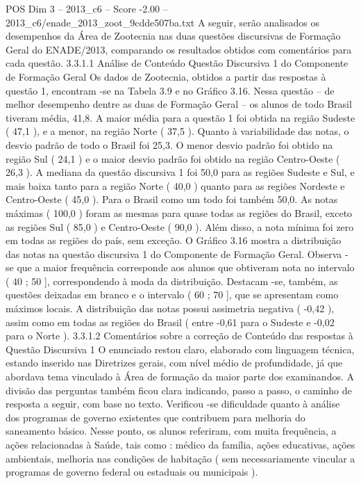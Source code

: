 \begin{textsample}{POS Dim 3 – 2013\_c6 – Score -2.00 – 2013\_c6/enade\_2013\_zoot\_9cdde507ba.txt}
A seguir, serão analisados os desempenhos da Área de Zootecnia nas duas questões discursivas de Formação Geral do ENADE/2013, comparando os resultados obtidos com comentários para cada questão. 3.3.1.1 Análise de Conteúdo Questão Discursiva 1 do Componente de Formação Geral Os dados de Zootecnia, obtidos a partir das respostas à questão 1, encontram -se na Tabela 3.9 e no Gráfico 3.16.
Nessa questão – de melhor desempenho dentre as duas de Formação Geral – os alunos de todo Brasil tiveram média, 41,8.
A maior média para a questão 1 foi obtida na região Sudeste ( 47,1 ), e a menor, na região Norte ( 37,5 ).
Quanto à variabilidade das notas, o desvio padrão de todo o Brasil foi 25,3.
O menor desvio padrão foi obtido na região Sul ( 24,1 ) e o maior desvio padrão foi obtido na região Centro-Oeste ( 26,3 ).
A mediana da questão discursiva 1 foi 50,0 para as regiões Sudeste e Sul, e mais baixa tanto para a região Norte ( 40,0 ) quanto para as regiões Nordeste e Centro-Oeste ( 45,0 ).
Para o Brasil como um todo foi também 50,0.
As notas máximas ( 100,0 ) foram as mesmas para quase todas as regiões do Brasil, exceto as regiões Sul ( 85,0 ) e Centro-Oeste ( 90,0 ).
Além disso, a nota mínima foi zero em todas as regiões do país, sem exceção.
O Gráfico 3.16 mostra a distribuição das notas na questão discursiva 1 do Componente de Formação Geral.
Observa -se que a maior frequência corresponde aos alunos que obtiveram nota no intervalo ( 40 ; 50 ], correspondendo à moda da distribuição.
Destacam -se, também, as questões deixadas em branco e o intervalo ( 60 ; 70 ], que se apresentam como máximos locais.
A distribuição das notas possui assimetria negativa ( -0,42 ), assim como em todas as regiões do Brasil ( entre -0,61 para o Sudeste e -0,02 para o Norte ). 3.3.1.2 Comentários sobre a correção de Conteúdo das respostas à Questão Discursiva 1 O enunciado restou claro, elaborado com linguagem técnica, estando inserido nas Diretrizes gerais, com nível médio de profundidade, já que abordava tema vinculado à Área de formação da maior parte dos examinandos.
A divisão das perguntas também ficou clara indicando, passo a passo, o caminho de resposta a seguir, com base no texto.
Verificou -se dificuldade quanto à análise dos programas de governo existentes que contribuem para melhoria do saneamento básico.
Nesse ponto, os alunos referiram, com muita frequência, a ações relacionadas à Saúde, tais como : médico da família, ações educativas, ações ambientais, melhoria nas condições de habitação ( sem necessariamente vincular a programas de governo federal ou estaduais ou municipais ).

\end{textsample}
